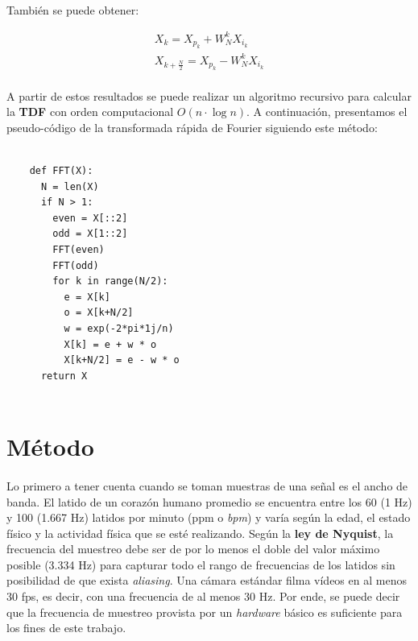 \documentclass[12pt, twocolumn]{article}
\begin{document}
	\paragraph{} También se puede obtener:
	
	\begin{align*}
		X_{k} = X_{p_{k}} + W_{N}^{k}X_{i_{k}} \\
		X_{k+\frac{N}{2}} = X_{p_{k}} - W_{N}^{k}X_{i_{k}}
	\end{align*}
	
	\paragraph{} A partir de estos resultados se puede realizar un algoritmo recursivo para calcular la \textbf{TDF} con orden computacional $O(n\cdot \log n)$. A continuación, presentamos el pseudo-código de la transformada rápida de Fourier siguiendo este método:
	
	\newpage
	  
	  
	\begin{lstlisting}[frame=single]  % Start your code-block
	
	def FFT(X):
	  N = len(X)
	  if N > 1:
	    even = X[::2]
	    odd = X[1::2]
	    FFT(even)
	    FFT(odd)
	    for k in range(N/2):
	      e = X[k]
	      o = X[k+N/2]
	      w = exp(-2*pi*1j/n)
	      X[k] = e + w * o
	      X[k+N/2] = e - w * o
	  return X
	  
	\end{lstlisting}
	
	
	\section{Método}
	
	\paragraph{} Lo primero a tener cuenta cuando se toman muestras de una señal es el ancho de banda. El latido de un corazón humano promedio se encuentra entre los 60 (1 Hz) y 100 (1.667 Hz) latidos por minuto (ppm o \textit{bpm}) y varía según la edad, el estado físico  y la actividad física que se esté realizando. Según la \textbf{ley de Nyquist}, la frecuencia del muestreo debe ser de por lo menos el doble del valor máximo posible (3.334 Hz) para capturar todo el rango de frecuencias de los latidos sin posibilidad de que exista \textit{aliasing}. Una cámara estándar filma vídeos en al menos 30 fps, es decir, con una frecuencia de al menos 30 Hz. Por ende, se puede decir que la frecuencia de muestreo provista por un \textit{hardware} básico es suficiente para los fines de este trabajo.
	
\end{document}
